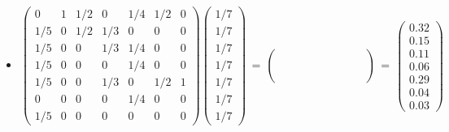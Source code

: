 \begin{itemize}
\begin{equation*}
\begin {array}{c|c|c|c|c|c|c}
 & & & & & & \\
 & & & & & & \\
 & & & & & & 
\end {array} \right] 
\end{equation*}
\item[遷移]
\begin{equation*}
\left( \begin {array}{ccccccc} 
0 &1 &1/2 &0 &1/4 &1/2 &0 \\
1/5 &0 &1/2 &1/3 &0 &0 &0 \\
1/5 &0 &0 &1/3 &1/4 &0 &0 \\
1/5 &0 &0 &0 &1/4 &0 &0 \\
1/5 &0 &0 &1/3 &0 &1/2 &1 \\
0 &0 &0 &0 &1/4 &0 &0 \\
1/5 &0 &0 &0 &0 &0 &0 
\end {array} \right) 
\left( \begin {array}{c} 
1/7\\ 
1/7\\ 
1/7\\ 
1/7\\ 
1/7\\ 
1/7\\ 
1/7 
\end {array} \right) \, = \, 
\left( \begin {array}{ccccccc} 
\, \, &\, \, &\, \, &\, \, &\, \, &\, \, &\, \, \\
 & & & & & & \\
 & & & & & & \\
 & & & & & & \\
 & & & & & & \\
 & & & & & & \\
 & & & & & & 
\end {array} \right)
\, = \, \left( \begin {array}{c} 
0.32\\ 
0.15\\ 
0.11\\ 
0.06\\ 
0.29\\ 
0.04\\ 
0.03 
\end {array} \right) 
\end{equation*}
\end{itemize}
\pagebreak
